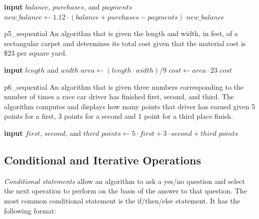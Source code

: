 \begin{algorithm}[H]
\caption*{Algorithm for problem ~\ref{prob:p4_sequential}}
	\begin{algorithmic}[1]
		\State \textbf{input} $balance$, $purchases$, and $payments$
		\State $new\_balance\gets 1.12\cdot(balance + purchases - payments)$
		\State \Output  $new\_balance$
	\end{algorithmic}
\end{algorithm}


\begin{problem}{}{p5_sequential}
An algorithm that is given the length and width, in feet, of a rectangular carpet and determines its total cost given that the material cost is $\$23$ per square yard.
\end{problem}

\begin{algorithm}
	\caption*{Algorithm for ~\ref{prob:p5_sequential}}
	\begin{algorithmic}[1]
		\State \textbf{input} $length$ and $width$
		\State $area\gets (length\cdot width) / 9$
		\State $cost\gets area \cdot 23$
		\State \Output $cost$
	\end{algorithmic}
\end{algorithm}

\begin{problem}{}{p6_sequential}
An algorithm that is given three numbers corresponding to the number of times a race car driver has finished first, second, and third. The algorithm computes and displays how many points that driver has earned given 5 points for a first, 3 points for a second and 1 point for a third place finish.
\end{problem}

\begin{algorithm}
	\caption*{Algorithm for problem ~\ref{prob:p6_sequential}}
	\begin{algorithmic}[1]
		\State \textbf{input} $first$, $second$, and $third$
		\State $points \gets 5\cdot first + 3\cdot second + third$
		\State \Output $points$
	\end{algorithmic}
\end{algorithm}

\subsection{Conditional and Iterative Operations}

\emph{Conditional statements} allow an algorithm to ask a yes/no question and select the next operation to perform on the basis of the answer to that question. The most common conditional statement is the if/then/else statement. It has the following format:

